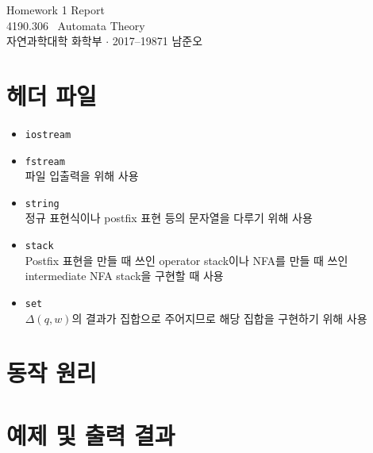 \documentclass{article}
\begin{document}
\begin{center}
	\Huge \textsf{Homework 1 Report}\\
	\Large \textsf{4190.306~ Automata Theory}\\ \vspace{0.15cm}
	\large \textsf{자연과학대학 화학부 $\cdot$ 2017--19871 남준오}\\
	\normalsize
	\vspace{0.5cm}
\end{center}

\begin{multicols}{2}

\section{헤더 파일}
\begin{itemize}
	\item \texttt{iostream}\\
	\item \texttt{fstream}\\파일 입출력을 위해 사용
	\item \texttt{string}\\정규 표현식이나 postfix 표현 등의 문자열을 다루기 위해 사용
	\item \texttt{stack}\\Postfix 표현을 만들 때 쓰인 operator stack이나 NFA를 만들 때 쓰인 intermediate NFA stack을 구현할 때 사용
	\item \texttt{set}\\$\Delta(q, w)$의 결과가 집합으로 주어지므로 해당 집합을 구현하기 위해 사용
\end{itemize}

\section{동작 원리}
\lipsum[1]

\section{예제 및 출력 결과}
\lipsum[1]

\end{multicols}
\end{document}
